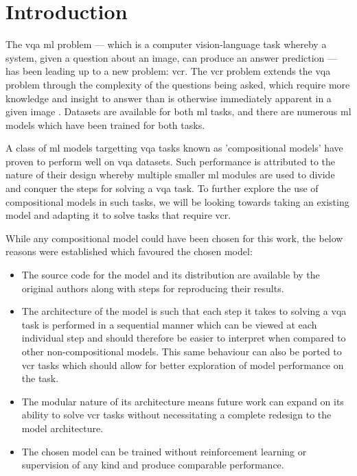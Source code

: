 \chapter{Introduction}
\label{chp:introduction}

The \acrlong{vqa} \gls{ml} problem --- which is a computer vision-language task whereby a system, given a question about an image, can produce an answer prediction \cite{agrawal_vqa_2016} --- has been leading up to a new problem: \acrfull{vcr}.
The \acrshort{vcr} problem extends the \acrshort{vqa} problem through the complexity of the questions being asked, which require more knowledge and insight to answer than is otherwise immediately apparent in a given image \cite{zellers_recognition_2019}.
Datasets are available for both \gls{ml} tasks, and there are numerous \gls{ml} models which have been trained for both tasks.

A class of \gls{ml} models targetting \gls{vqa} tasks known as 'compositional models'\cite{andreas_neural_2016} have proven to perform well on \gls{vqa} datasets\cite{fishandi_neural_2023}.
Such performance is attributed to the nature of their design whereby multiple smaller \gls{ml} modules are used to divide and conquer the steps for solving a \gls{vqa} task.
To further explore the use of compositional models in such tasks, we will be looking towards taking an existing model and adapting it to solve tasks that require \gls{vcr}.

While any compositional model could have been chosen for this work, the below reasons were established which favoured the chosen model:

\begin{itemize}\label{list:reasons_for_nmn}
    \item The source code for the model and its distribution are available by the original authors along with steps for reproducing their results.
    \item The architecture of the model is such that each step it takes to solving a \gls{vqa} task is performed in a sequential manner which can be viewed at each individual step and should therefore be easier to interpret when compared to other non-compositional models.
          This same behaviour can also be ported to \gls{vcr} tasks which should allow for better exploration of model performance on the task.
    \item The modular nature of its architecture means future work can expand on its ability to solve \gls{vcr} tasks without necessitating a complete redesign to the model architecture.
    \item The chosen model can be trained without reinforcement learning or supervision of any kind and produce comparable performance.
\end{itemize}

